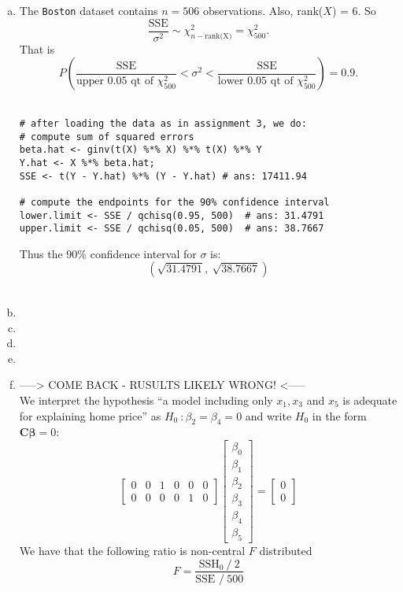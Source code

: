 \documentclass[paper=a4, fontsize=11pt]{scrartcl} %
\newcommand{\vecBeta}{\mathbf{\beta}}
\newcommand{\matC}{\mathbf{C}}
\begin{document}
\begin{enumerate}[(a)]

\item The \texttt{Boston} dataset contains $n = 506$ observations. Also, rank($X$) = 6. So
$$\frac{\text{SSE}}{ \sigma^2}  \sim \chi^2_{n - \text{rank(X)}} = \chi^2_{500}.$$
That is
$$
P \left(\frac{\text{SSE}}{\text{upper  0.05 } \text{qt of }\chi^2_{500} }  <  \sigma^2 < \frac{\text{SSE}}{\text{lower  0.05 } \text{qt of }\chi^2_{500}}  \right) = 0.9.
$$\\

\begin{lstlisting}[basicstyle=\ttfamily\small\bfseries]
# after loading the data as in assignment 3, we do:
# compute sum of squared errors
beta.hat <- ginv(t(X) %*% X) %*% t(X) %*% Y
Y.hat <- X %*% beta.hat;  
SSE <- t(Y - Y.hat) %*% (Y - Y.hat) # ans: 17411.94

# compute the endpoints for the 90% confidence interval
lower.limit <- SSE / qchisq(0.95, 500)  # ans: 31.4791
upper.limit <- SSE / qchisq(0.05, 500)  # ans: 38.7667
\end{lstlisting}
Thus the 90\% confidence interval for $\sigma$ is:
$$
\left(\sqrt{31.4791},  \ \sqrt{38.7667}\right) 
$$\\


\item 
\item
\item
\item

\item 
 ----->   COME BACK - RUSULTS LIKELY WRONG!  <-----\\


We interpret the hypothesis  ``a model including only $ x_1, x_3$ and $x_5$ is 
adequate for explaining home price'' as $H_0 \ : \beta_2 = \beta_4 = 0$ and 
write  $H_0$  in the form $\matC \vecBeta = 0$:  
$$  
\begin{bmatrix} 0 & 0 & 1 & 0 & 0 & 0\\
                             0 & 0 & 0 & 0 & 1 & 0
\end{bmatrix}
\begin{bmatrix} \beta_0\\
                             \beta_1\\
                             \beta_2\\
                             \beta_3\\
                             \beta_4 \\
                             \beta_5
\end{bmatrix}
=
\begin{bmatrix} 0\\
                             0
\end{bmatrix}
$$  
We have that the following ratio is non-central $F$ distributed
$$
F = \frac{\text{SSH}_0 \  / \  2}{ \text{SSE }  / \  500 }
$$


\end{enumerate}
\end{document}
